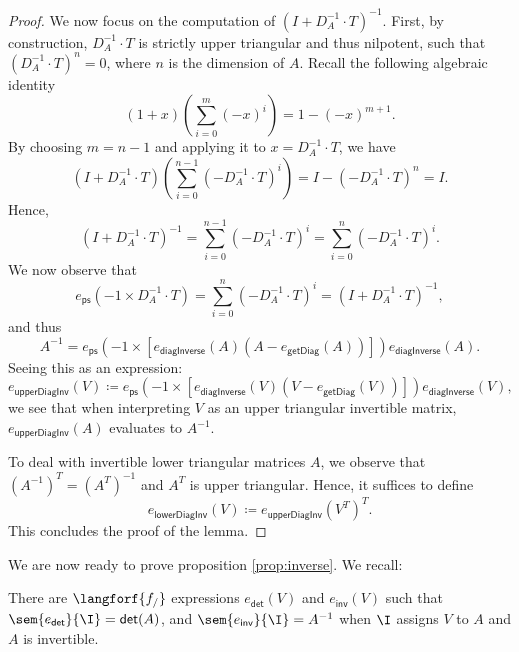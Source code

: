 \begin{proof}
We now focus on the computation of $\left( I+D_A^{-1}\cdot T\right)^{-1}$. First, by construction, $D_A^{-1}\cdot T$ is strictly upper triangular and thus nilpotent, 
such that $\left( D_A^{-1}\cdot T\right)^n=0$, where $n$ is the dimension of $A$.
Recall the following algebraic identity 
$$(1+x)\left( \sum_{i=0}^{m}(-x)^i \right)=1-(-x)^{m+1}.$$
By choosing $m=n-1$ and applying it to $x=D_A^{-1}\cdot T$, we have
$$
\left(I+D_A^{-1}\cdot T \right)\left( \sum_{i=0}^{n-1}(-D_A^{-1}\cdot T)^i \right)=I- \left( -D_A^{-1}\cdot T\right)^n =I.
$$
Hence,
$$
\left(I+D_A^{-1}\cdot T \right)^{-1}=\sum_{i=0}^{n-1}(-D_A^{-1}\cdot T)^i=\sum_{i=0}^{n}(-D_A^{-1}\cdot T)^i.
$$
We now observe that
$$
e_{\mathsf{ps}}(-1\times D_A^{-1}\cdot T)=\sum_{i=0}^{n}(-D_A^{-1}\cdot T)^i=\left(I+D_A^{-1}\cdot T \right)^{-1},
$$
and thus 
$$
A^{-1}= e_{\mathsf{ps}}\left(-1\times \left[e_{\mathsf{diagInverse}}(A)(A-e_{\mathsf{getDiag}}(A))\right] \right)e_{\mathsf{diagInverse}}(A).
$$
Seeing this as an expression:
$$
e_{\mathsf{upperDiagInv}}(V)\coloneqq  e_{\mathsf{ps}}\left(-1\times \left[e_{\mathsf{diagInverse}}(V)(V-e_{\mathsf{getDiag}}(V))\right] \right)e_{\mathsf{diagInverse}}(V),
$$
we see that  when interpreting $V$ as an  upper triangular invertible matrix, 
$e_{\mathsf{upperDiagInv}}(A)$ evaluates to $A^{-1}$.


To deal with invertible lower triangular matrices $A$, we observe that  $\left(A^{-1}\right)^T=\left(A^T\right)^{-1}$ and $A^T$ is upper triangular.
Hence, it suffices to define
$$
e_{\mathsf{lowerDiagInv}}(V)\coloneqq  e_{\mathsf{upperDiagInv}}(V^T)^T.
$$
This concludes the proof of the lemma.
\end{proof}

We are now ready to prove proposition \ref{prop:inverse}. We recall:
\begin{INVERSE}
  There are $\langforf{f_/}$ expressions $e_{\mathsf{det}}(V)$ and $e_{\mathsf{inv}}(V)$ such that
  $\sem{e_{\mathsf{det}}}{\I}=\mathsf{det}(A)$, and  
  $\sem{e_{\mathsf{inv}}}{\I}=A^{-1}$ when $\I$ assigns $V$
  to $A$ and $A$ is invertible.
\end{INVERSE}

